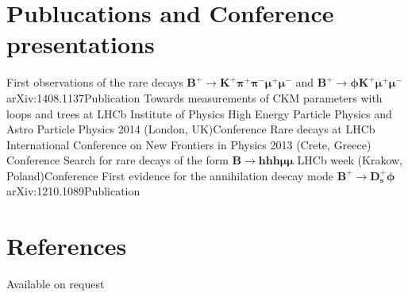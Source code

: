 






\section{Publucations and Conference presentations}


{First observations of the rare decays
  $\boldsymbol{B^+\!\to K^+\pi^+\pi^-\mu^+\mu^-}$ and
  $\boldsymbol{B^+\!\to\phi K^+\mu^+\mu^-}$}
  {arXiv:1408.1137}{Publication}
{Towards measurements of CKM parameters with loops and trees at LHCb}
{Institute of Physics High Energy Particle Physics and Astro Particle
Physics 2014 (London, UK)}{Conference}
{Rare decays at LHCb}
{International Conference on New Frontiers in Physics 2013 (Crete, Greece)}
{Conference}
{Search for rare decays of the form $\boldsymbol{B\to hhh\mu\mu}$}
{LHCb week (Krakow, Poland)}{Conference}
{First evidence for the annihilation deecay mode $\boldsymbol{B^+\!\to D_s^+\phi}$}
{arXiv:1210.1089}{Publication}






\section{References}
Available on request




